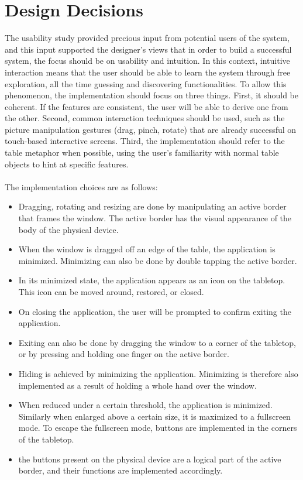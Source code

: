 \section{Design Decisions}

The usability study provided precious input from potential users of the system, and this input supported the designer's views that in order to build a successful system, the focus should be on usability and intuition.
In this context, intuitive interaction means that the user should be able to learn the system through free exploration, all the time guessing and discovering functionalities.
To allow this phenomenon, the implementation should focus on three things.
First, it should be coherent. If the features are consistent, the user will be able to derive one from the other.
Second, common interaction techniques should be used, such as the picture manipulation gestures (drag, pinch, rotate) that are already successful on touch-based interactive screens.
Third, the implementation should refer to the table metaphor when possible, using the user's familiarity with normal table objects to hint at specific features.\\
\hfill\\
The implementation choices are as follows:
\begin{itemize}
\item Dragging, rotating and resizing are done by manipulating an active border that frames the window. The active border has the visual appearance of the body of the physical device.
\item When the window is dragged off an edge of the table, the application is minimized. Minimizing can also be done by double tapping the active border.
\item In its minimized state, the application appears as an icon on the tabletop. This icon can be moved around, restored, or closed.
\item On closing the application, the user will be prompted to confirm exiting the application.
\item Exiting can also be done by dragging the window to a corner of the tabletop, or by pressing and holding one finger on the active border.
\item Hiding is achieved by minimizing the application. Minimizing is therefore also implemented as a result of holding a whole hand over the window.
\item When reduced under a certain threshold, the application is minimized. Similarly when enlarged above a certain size, it is maximized to a fullscreen mode. To escape the fullscreen mode, buttons are implemented in the corners of the tabletop.
\item the buttons present on the physical device are a logical part of the active border, and their functions are implemented accordingly.
\end{itemize}
